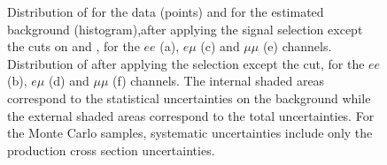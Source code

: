 \begin{figure}[t]
\caption{Distribution of \met{} for the data (points) and for the estimated background (histogram),after applying the signal selection except the cuts on \met{} and \HT{}, for the $ee$ (a), $e\mu$ (c)
and $\mu\mu$ (e) channels. Distribution of \HT{} after applying the selection except the \HT{} cut, for the $ee$ (b), $e\mu$ (d) and $\mu\mu$ (f) channels. The internal shaded areas correspond to the
statistical uncertainties on the background while the external shaded areas correspond to the total uncertainties. For the Monte Carlo samples, systematic uncertainties include only the production cross section uncertainties.}\label{fig:signal}
\end{figure}




